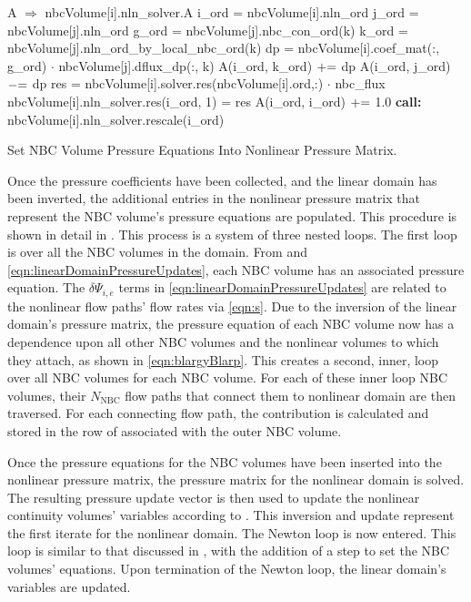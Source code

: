 \begin{algo}[ht!]
\setlength{\baselineskip}{0.625\baselineskip}
\begin{algorithmic}[1]
	\Set A $\Rightarrow$ nbcVolume[i].nln\_solver.A
	\Set i\_ord = nbcVolume[i].nln\_ord
		\Set j\_ord = nbcVolume[j].nln\_ord
			\Set g\_ord = nbcVolume[j].nbc\_con\_ord(k)
			\Set k\_ord = nbcVolume[j].nln\_ord\_by\_local\_nbc\_ord(k)
			\Set dp = nbcVolume[i].coef\_mat(:, g\_ord) $\cdot$ nbcVolume[j].dflux\_dp(:, k)
			\Set A(i\_ord, k\_ord) $\mathrel{+}=$ dp
			\Set A(i\_ord, j\_ord) $\mathrel{-}=$ dp
		\EndFor
	\EndFor
	\Set res = nbcVolume[i].solver.res(nbcVolume[i].ord,:) $\cdot$ nbc\_flux
	\Set nbcVolume[i].nln\_solver.res(i\_ord, 1) = res
	\Set A(i\_ord, i\_ord) $\mathrel{+}=$ 1.0
	\State \textbf{call:} nbcVolume[i].nln\_solver.rescale(i\_ord)
\EndFor
\end{algorithmic}
\caption{Set NBC Volume Pressure Equations Into Nonlinear Pressure Matrix.}
\label{alg:domDecompSetMat}
\end{algo}

Once the pressure coefficients have been collected, and the linear domain has been inverted, the additional entries in the nonlinear pressure matrix that represent the NBC volume's pressure equations are populated.
This procedure is shown in detail in .
This process is a system of three nested loops.
The first loop is over all the NBC volumes in the domain.
From  and \eqref{eqn:linearDomainPressureUpdates}, each NBC volume has an associated pressure equation.
The $\delta \Psi_{i,e}$ terms in \eqref{eqn:linearDomainPressureUpdates} are related to the nonlinear flow paths' flow rates via \eqref{eqn:s}.
Due to the inversion of the linear domain's pressure matrix, the pressure equation of each NBC volume now has a dependence upon all other NBC volumes and the nonlinear volumes to which they attach, as shown in \eqref{eqn:blargyBlarp}.
This creates a second, inner, loop over all NBC volumes for each NBC volume.
For each of these inner loop NBC volumes, their $N_{\text{NBC}}$ flow paths that connect them to nonlinear domain are then traversed.
For each connecting flow path, the contribution is calculated and stored in the row of  associated with the outer NBC volume. 

Once the pressure equations for the NBC volumes have been inserted into the nonlinear pressure matrix, the pressure matrix for the nonlinear domain is solved.
The resulting pressure update vector is then used to update the nonlinear continuity volumes' variables according to .
This inversion and update represent the first iterate for the nonlinear domain.
The Newton loop is now entered.
This loop is similar to that discussed in , with the addition of a step to set the NBC volumes' equations.
Upon termination of the Newton loop, the linear domain's variables are updated.

